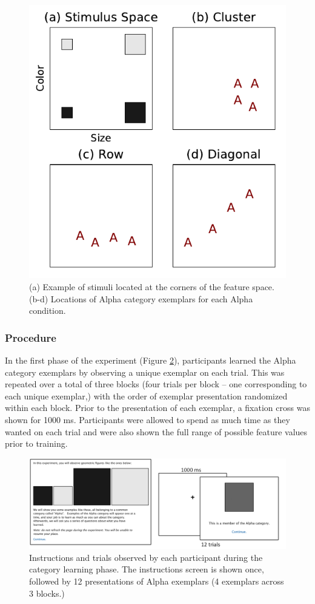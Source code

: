 \documentclass[10pt,letterpaper]{article}
\begin{document}
\begin{figure}%
\begin{center}
\includegraphics[width=.5\textwidth]{Figures/conditions.pdf}
\end{center}
\caption{(a) Example of stimuli located at the corners of the feature space. (b-d) Locations of Alpha category exemplars for each Alpha condition.} 
\label{fig:alphas}
\end{figure}


\subsubsection{Procedure}
In the first phase of the experiment (Figure \ref{fig:screens_learn}), participants learned the Alpha category exemplars
by observing a unique exemplar on each trial. This was repeated over a total of three blocks (four trials per block --
one corresponding to each unique exemplar,) with the order of exemplar presentation randomized within each block. Prior
to the presentation of each exemplar, a fixation cross was shown for 1000 ms. Participants were allowed to spend as much
time as they wanted on each trial and were also shown the full range of possible feature values prior to training.

\begin{figure}%
\begin{center}
    \includegraphics[width=\textwidth]{Figures/screens_learn.png}
\end{center}
\caption{Instructions and trials observed by each participant during the category learning phase. The instructions screen is
shown once, followed by 12 presentations of Alpha exemplars (4 exemplars across 3 blocks.)}
\label{fig:screens_learn}
\end{figure}
\end{document}
